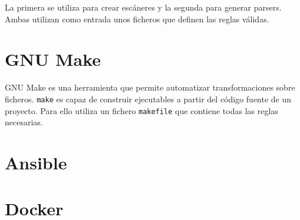 La primera se utiliza para crear escáneres y la segunda para generar parsers. Ambas utilizan como entrada unos ficheros que definen las reglas válidas.

\section{GNU Make}

GNU Make es una herramienta que permite automatizar transformaciones sobre ficheros. \verb|make| es capaz de construir ejecutables a partir del código fuente de un proyecto. Para ello utiliza un fichero \verb|makefile| que contiene todas las reglas necesarias.

\section{Ansible}

\section{Docker}

